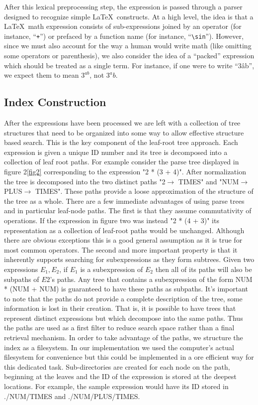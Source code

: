 \documentclass{sig-alternate}
\begin{document}
After this lexical preprocessing step, the expression is passed through a parser designed to recognize simple \LaTeX\, constructs.  At a high level, the idea is that a \LaTeX\, math expression consists of sub-expressions joined by an operator (for instance, ``\texttt{+}'') or prefaced by a function name (for instance, ``\texttt{\textbackslash sin}'').  However, since we must also account for the way a human would write math (like omitting some operators or parenthesis), we also consider the idea of a ``packed'' expression which should be treated as a single term.  For instance, if one were to write ``3\^ab'', we expect them to mean $3^{ab}$, not $3^ab$. 

\subsection{Index Construction}
After the expressions have been processed we are left with a collection of tree structures that need to be organized into some way to allow effective structure based search. This is the key component of the leaf-root tree approach. Each expression is given a unique ID number and its tree is decomposed into a collection of leaf root paths. For example consider the parse tree displayed in figure 2\ref{fig2} corresponding to the expression "2 * (3 + 4)". After normalization the tree is decomposed into the two distinct paths "2$\rightarrow$ TIMES" and "NUM$\rightarrow$ PLUS$\rightarrow$ TIMES". These paths provide a loose approximation of the structure of the tree as a whole. 
There are a few immediate advantages of using parse trees and in particular leaf-node paths. The first is that they assume commutativity of operations. If the expression in figure two was instead "2 * (4 + 3)" its representation as a collection of leaf-root paths would be unchanged. Although there are obvious exceptions this is a good general assumption as it is true for most common operators.
The second and more important property is that it inherently supports searching for subexpressions as they
form subtrees. Given two expressions $E_1, E_2$, if $E_1$ is a subexpression of $E_2$ then all of its
paths will also be subpaths of $E2$'s paths. Any tree that contains a subexpression of the form NUM * (NUM + NUM) is guaranteed to have these paths as subpaths. 
It's important to note that the paths do not provide a complete description of the tree, some information is lost in their creation. That is, it is possible to have trees that represent distinct expressions but which decompose into the same paths. Thus the paths are used as a first filter to reduce search space rather than a final retrieval mechanism. In order to take advantage of the paths, we structure the index as a filesystem. In our implementation we used the computer's actual filesystem for convenience but this could be implemented in a ore efficient way for this dedicated task. Sub-directories are created for each node on the path, beginning at the leaves and the ID of the expression is stored at the deepest locations. For example, the sample expression would have its ID stored in ./NUM/TIMES and ./NUM/PLUS/TIMES. 
\end{document}
